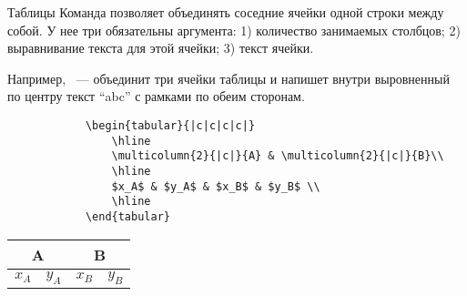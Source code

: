 \begin{frame}[fragile]{Таблицы}
	\small	
	Команда \texttt{\multicolumn} позволяет объединять соседние ячейки одной строки между собой. У нее три обязательны аргумента: 1) количество занимаемых столбцов; 2) выравнивание текста для этой ячейки;
	3) текст ячейки. 
	
	Например, \texttt{}~--- объединит три ячейки таблицы и напишет внутри выровненный по центру текст ``abc'' с рамками по обеим сторонам. 
	
	\begin{minipage}{0.74\textwidth}
		\begin{verbatim}
			\begin{tabular}{|c|c|c|c|}
				\hline
				\multicolumn{2}{|c|}{A} & \multicolumn{2}{|c|}{B}\\
				\hline
				$x_A$ & $y_A$ & $x_B$ & $y_B$ \\
				\hline
			\end{tabular}
		\end{verbatim}
	\end{minipage}
	\begin{minipage}{0.24\textwidth}
	\begin{center}
		\begin{tabular}{|c|c|c|c|}
			\hline
			\multicolumn{2}{|c|}{A} & \multicolumn{2}{|c|}{B}\\
			\hline
			$x_A$ & $y_A$ & $x_B$ & $y_B$ \\
			\hline
		\end{tabular}
	\end{center}
	\end{minipage}
\end{frame}


